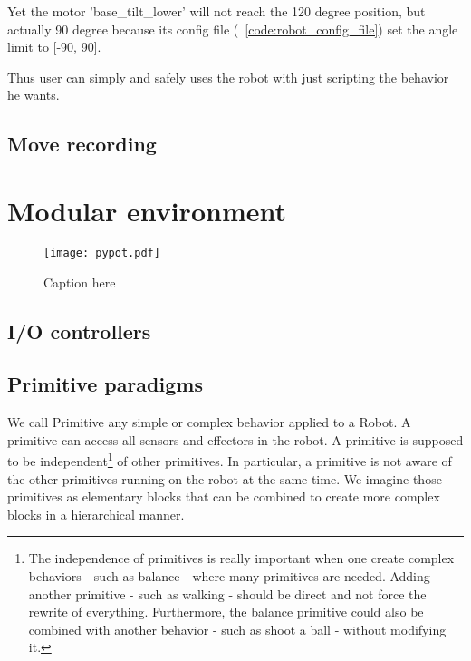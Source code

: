 Yet the motor 'base\_tilt\_lower' will not reach the 120 degree position, but actually 90 degree because its config file (\codename~\ref{code:robot_config_file}) set the angle limit to [-90, 90].

Thus user can simply and safely uses the robot with just scripting the behavior he wants.



\subsection{Move recording} %
\label{sub:move_recording}



\section{Modular environment} %



\begin{figure}[p]
    \begin{center}
        \texttt{[image: pypot.pdf]}
    \end{center}
    \caption{Caption here}
    \label{fig:pypot-modular-architecture}
\end{figure}


\subsection{I/O controllers} %




\subsection{Primitive paradigms} %
We call Primitive any simple or complex behavior applied to a Robot. A primitive can access all sensors and effectors in the robot. A primitive is supposed to be independent\footnote{The independence of primitives is really important when one create complex behaviors - such as balance - where many primitives are needed. Adding another primitive - such as walking - should be direct and not force the rewrite of everything. Furthermore, the balance primitive could also be combined with another behavior - such as shoot a ball - without modifying it.} of other primitives. In particular, a primitive is not aware of the other primitives running on the robot at the same time. We imagine those primitives as elementary blocks that can be combined to create more complex blocks in a hierarchical manner.

